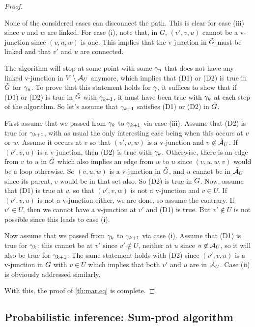 \begin{proof}
\begin{enumerate}[label={\it Step \arabic*.}]
None of the considered cases can disconnect the path. This is clear
for case (iii)  since $v$ and $w$ are linked. For case (i), note that,
in $G$, $(v',v, u)$ cannot be a v-junction since $(v,u,w)$ is
one. This implies that the v-junction in ${\tilde{G}}$ must be linked and that
$v'$ and $u$ are connected.

The algorithm will stop at some point with some $\gamma_n$ that does not
have any linked v-junction in $V\setminus {\mathcal A}_U$ anymore, which implies
that (D1) or (D2) is true in ${\tilde{G}}$ for $\gamma_n$. To prove that this
statement holds for $\gamma$, it suffices to show that if (D1) or (D2) is true
in ${\tilde{G}}$ with
$\gamma_{k+1}$, it must have been true with $\gamma_k$ at each step of the
algorithm. So let's assume that $\gamma_{k+1}$ satisfies (D1) or (D2) in ${\tilde{G}}$. 

First assume
that we passed from $\gamma_k$ to $\gamma_{k+1}$ via case (iii). Assume that
(D2) is true for $\gamma_{k+1}$, with as usual the only interesting case
being when this occurs at $v$ or $w$. Assume it occurs at $v$ so that
$(v',v,w)$ is a v-junction and $v\not\in \tilde{{\mathcal A}}_U$. If $(v',v,u)$
is a v-junction, then (D2) is true with $\gamma_k$. Otherwise, there is an
edge from $v$ to $u$ in ${\tilde{G}}$ which also implies an edge from $w$ to
$u$ since $(v,u,w,v)$ would be a loop otherwise.  So $(v,u,w)$ is a
v-junction in ${\tilde{G}}$, and $u$ cannot be in $\tilde{{\mathcal A}}_U$ since its
parent, $v$ would be in that set also. So (D2) is true in ${\tilde{G}}$. Now,
assume that 
(D1) is true at $v$, so that $(v',v,w)$ is not a v-junction and $v\in
U$. If $(v',v,u)$ is not a v-junction either, we are done, so assume
the contrary. If $v'\in U$, then we cannot have a v-junction at $v'$
and (D1) is true. But $v'\not\in U$ is not possible since this leads
to case (i).

Now assume that we passed from $\gamma_{k}$ to $\gamma_{k+1}$ via case
(i). Assume that (D1) is true for $\gamma_k$: this cannot be at $v'$
since $v'\not\in U$, neither at $u$ since $u\not\in {\mathcal A}_U$, so it will
also be true for $\gamma_{k+1}$. The same statement holds with (D2) since
$(v',v,u)$ is a v-junction in ${\tilde{G}}$ with $v\in U$ which implies that
both $v'$ and $u$ are in $\tilde{{\mathcal A}}_U$. Case (ii) is obviously
addressed similarly.
\end{enumerate}
With this,  the proof
of  \cref{th:mar.eq} is complete.
\end{proof}

 
\subsection{Probabilistic inference: Sum-prod algorithm}

